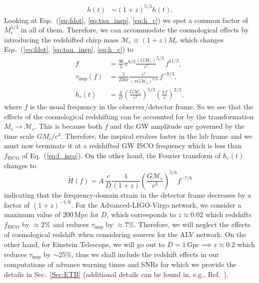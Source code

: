 \documentclass[prd,amsmath,amssymb,aps,floats,amsfonts,notitlepage,superscriptaddress,eqsecnum,nofootinbib,10pt]{revtex4-1}
\newcommand{\f}{\frac}
\newcommand{\be}{\begin{equation}}
\newcommand{\ee}{\end{equation}}
\begin{document}
\begin{enumerate}
\begin{align}
h(t) & \sim (1+z)^{5/3} h(t).
\end{align}
%
Looking at Eqs.~(\ref{eq:fdot}, \ref{eq:tau_insp}, \ref{eq:h_c}) we spot a common factor of $M_c^{5/3}$ in all of them.
Therefore, we can accommodate the cosmological effects by introducing the redshifted chirp mass $\mathcal{M}_c\equiv (1+z) M_c$
which changes Eqs.~(\ref{eq:fdot}, \ref{eq:tau_insp}, \ref{eq:h_c}) to
%
\begin{align}
\dot{f} &= \f{96}{5}\pi^{8/3} \f{(G \mathcal{M}_c)}{c^5}^{5/3}\, f^{11/3} \label{eq:fdot_redshifted},\\
\tau_\text{insp}(f) &= \f{5}{256\pi}\f{c^5}{(\pi G \mathcal{M}_c)^{5/3}} \,f^{-8/3}\label{eq:tau_insp_redshifted}, \\
h_c(t) & = \f{4}{D}\left(\f{G \mathcal{M}_c}{c^2}\right)^{5/3}\left(\frac{\pi f}{c}\right)^{2/3} \label{eq:strain_TD_redshifted},
\end{align}
%
where $f$ is the usual frequency in the observer/detector frame.
So we see that the effects of the cosmological redshifting can be accounted for by the transformation $M_c\rightarrow \mathcal{M}_c$.
This is because both $\dot{f}$ and the GW amplitude are governed by the time scale $G M_c/c^3$.
Therefore, the inspiral evolves faster in the lab frame %
and we must now terminate it at a redshifted GW ISCO frequency which is less than $f_\text{ISCO}$ of Eq.~(\ref{eq:f_isco}).
On the other hand, the Fourier transform of $h_c(t)$ changes to 
%
\be
\tilde{H}(f) = A\, \f{c}{D} \f{1}{(1+z)} \left(\f{G \mathcal{M}_c}{c^3}\right)^{5/6} f^{-7/6}
\ee
indicating that the frequency-domain strain in the detector frame decreases by a factor of $(1+z)^{-1/6}$. %
%
For the Advanced-LIGO-Virgo network,
we consider a maximum value of 200\,Mpc for $D$,
which corresponds to $z \approx 0.02$ which redshifts $f_\text{ISCO}$ by $\approx 2\%$ and reduces $\tau_\text{insp}$ by $\approx 7\%$.
Therefore, we will neglect the effects of cosmological redshift 
when considering sources for the ALV network.
On the other hand, for Einstein Telescope, we will go out to $D=1\,\text{Gpc}\implies z\approx 0.2$
which reduces $\tau_\text{insp}$ by $\sim 25\%$, thus we shall include the redshift effects in our computations of advance warning times and SNRs
for which we provide the details in Sec.~\ref{Sec:ETB} (additional details can be found in, e.g., Ref.~\cite{Phinney:2001di}). 

%
\end{enumerate}
%
%
\end{document}

